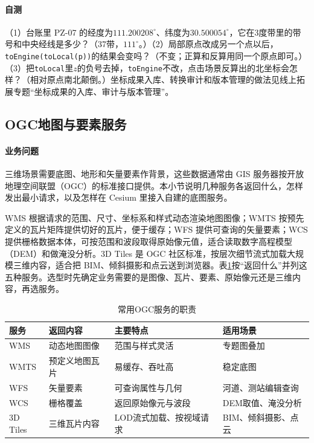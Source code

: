 \paragraph{自测}（1）台账里 PZ-07 的经度为$111.200208^\circ$、纬度为$30.500054^\circ$，它在3度带里的带号和中央经线是多少？（37带，$111^\circ$。）（2）局部原点改成另一个点以后，\texttt{toEngine(toLocal(p))}的结果会变吗？（不变；正算和反算用同一个原点即可。）（3）把\texttt{toLocal}里$z$的负号去掉，\texttt{toEngine}不改，点击场景反算出的北坐标会怎样？（相对原点南北颠倒。）坐标成果入库、转换审计和版本管理的做法见线上拓展专题“坐标成果的入库、审计与版本管理”。

\subsection{OGC地图与要素服务}

\paragraph{业务问题}三维场景需要底图、地形和矢量要素作背景，这些数据通常由 GIS 服务器按开放地理空间联盟（OGC）的标准接口提供。本小节说明几种服务各返回什么，怎样发出最小请求，以及怎样在 Cesium 里接入自建的底图服务。

WMS 根据请求的范围、尺寸、坐标系和样式动态渲染地图图像；WMTS 按预先定义的瓦片矩阵提供切好的瓦片，便于缓存；WFS 提供可查询的矢量要素；WCS 提供栅格数据本体，可按范围和波段取得原始像元值，适合读取数字高程模型（DEM）和做淹没分析\cite{ogcWMS,ogcWMTS,ogcWCS}。3D Tiles 是 OGC 社区标准，按层次细节流式加载大规模三维内容，适合把 BIM、倾斜摄影和点云送到浏览器。表\ref{tab:ogc-services}按“返回什么”并列这五种服务。选型时先确定业务需要的是图像、瓦片、要素、原始像元还是三维内容，再选服务。

\begin{table}[htbp]
\centering
\caption{常用OGC服务的职责}
\label{tab:ogc-services}
\begin{tabular}{llll}
\toprule
服务 & 返回内容 & 主要特点 & 适用场景 \\
\midrule
WMS & 动态地图图像 & 范围与样式灵活 & 专题图叠加 \\
WMTS & 预定义地图瓦片 & 易缓存、吞吐高 & 稳定底图 \\
WFS & 矢量要素 & 可查询属性与几何 & 河道、测站编辑查询 \\
WCS & 栅格覆盖 & 返回原始像元与波段 & DEM取值、淹没分析 \\
3D Tiles & 三维瓦片内容 & LOD流式加载、按视域请求 & BIM、倾斜摄影、点云 \\
\bottomrule
\end{tabular}
\end{table}

